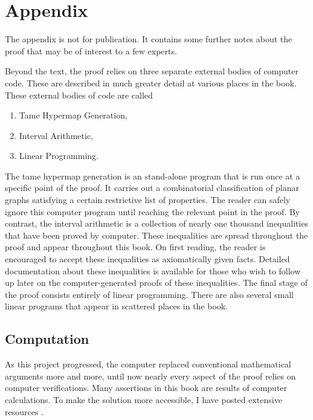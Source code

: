 \chapter{Appendix}

\begin{note}%
The appendix is not for publication.  It contains some further notes about the
proof that may be of interest to a few experts.
\end{note}

Beyond the text, the proof relies on three separate external bodies of
computer code.  These are described in much greater detail at various
places in the book.  These external bodies of code are called
\begin{enumerate}
\item Tame Hypermap Generation,
\item Interval Arithmetic,
\item Linear Programming.
\end{enumerate}
The tame hypermap generation is an stand-alone program that is run
once at a specific point of the proof.  It carries out a combinatorial
classification of planar graphs satisfying a certain restrictive list
of properties.  The reader can safely ignore this computer program
until reaching the relevant point in the proof.  By contrast, the
interval arithmetic is a collection of nearly one thousand
inequalities that have been proved by computer.  These inequalities
are spread throughout the proof and appear throughout this book.  On
first reading, the reader is encouraged to accept these inequalities
as axiomatically given facts.  Detailed documentation about these
inequalities is available for those who wish to follow up later on the
computer-generated proofs of these inequalities.  The final stage of
the proof consists entirely of linear programming.  There are also
several small linear programs that appear in scattered places in the
book.

\section{Computation}

As this project  progressed, the computer  replaced conventional
mathematical arguments more and more, until now
nearly every aspect of the proof relies on
computer verifications.  Many assertions in this book
are results of computer calculations.
To make the solution more accessible, I have
posted extensive resources \cite{web}.

